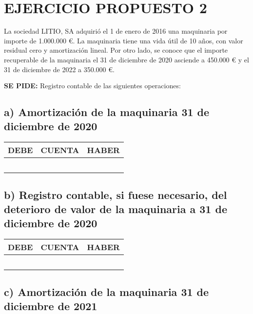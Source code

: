 \section*{EJERCICIO PROPUESTO 2}

La sociedad LITIO, SA adquirió el 1 de enero de 2016 una maquinaria por importe de 1.000.000 €. La maquinaria tiene una vida útil de 10 años, con valor residual cero y amortización lineal. Por otro lado, se conoce que el importe recuperable de la maquinaria el 31 de diciembre de 2020 asciende a 450.000 € y el 31 de diciembre de 2022 a 350.000 €.

\textbf{SE PIDE:} Registro contable de las siguientes operaciones:

\subsection*{a) Amortización de la maquinaria 31 de diciembre de 2020}

\begin{table}[h!]
\centering
\begin{tabular}{|c|c|c|}
\hline
DEBE & CUENTA & HABER \\
\hline
 &  &  \\
 &  &  \\
 &  &  \\
 &  &  \\
 &  &  \\
\hline
\end{tabular}
\end{table}

\subsection*{b) Registro contable, si fuese necesario, del deterioro de valor de la maquinaria a 31 de diciembre de 2020}

\begin{table}[h!]
\centering
\begin{tabular}{|c|c|c|}
\hline
DEBE & CUENTA & HABER \\
\hline
 &  &  \\
 &  &  \\
 &  &  \\
 &  &  \\
 &  &  \\
\hline
\end{tabular}
\end{table}

\subsection*{c) Amortización de la maquinaria 31 de diciembre de 2021}

